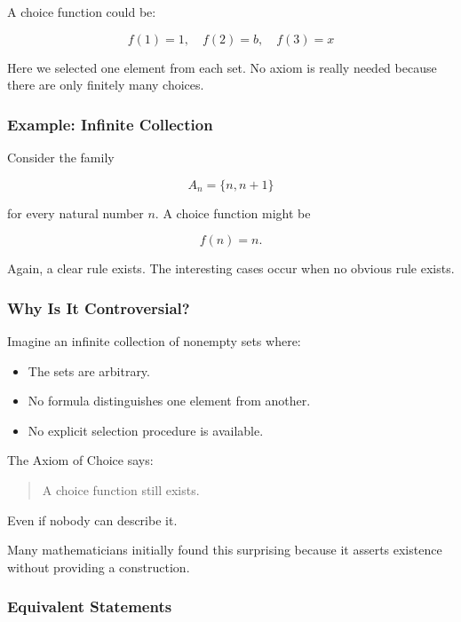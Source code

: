 \documentclass[11pt]{article}
\begin{document}
A choice function could be:

\[
f(1)=1,\quad
f(2)=b,\quad
f(3)=x
\]

Here we selected one element from each set. No axiom is really needed because there are only finitely many choices.
\subsubsection{Example: Infinite Collection}
\label{sec:org36b84bb}
Consider the family

\[
A_n=\{n,n+1\}
\]

for every natural number \(n\). A choice function might be

\[
f(n)=n.
\]

Again, a clear rule exists. The interesting cases occur when no obvious rule exists.
\subsubsection{Why Is It Controversial?}
\label{sec:orge7f0a48}

Imagine an infinite collection of nonempty sets where:

\begin{itemize}
\item The sets are arbitrary.
\item No formula distinguishes one element from another.
\item No explicit selection procedure is available.
\end{itemize}

The Axiom of Choice says:

\begin{quote}
A choice function still exists.
\end{quote}

Even if nobody can describe it.

Many mathematicians initially found this surprising because it asserts existence without providing a construction.
\subsubsection{Equivalent Statements}
\label{sec:orgaf8d0de}
\end{document}
